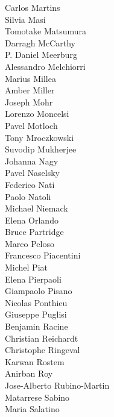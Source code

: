 \documentclass[PICOAPC.tex]{subfiles}
\begin{document}
{\begin{multicols}{4}
Carlos Martins                  \\
Silvia Masi                     \\
Tomotake Matsumura              \\
Darragh McCarthy                \\
P. Daniel Meerburg              \\
Alessandro Melchiorri           \\
Marius Millea                   \\
Amber Miller                    \\
Joseph Mohr                     \\
Lorenzo Moncelsi                \\
Pavel Motloch                   \\
Tony Mroczkowski                \\
Suvodip Mukherjee               \\
Johanna Nagy                    \\
Pavel Naselsky                  \\
Federico Nati                   \\
Paolo Natoli                    \\
Michael Niemack                 \\
Elena Orlando                   \\
Bruce Partridge                 \\
Marco Peloso                    \\
Francesco Piacentini            \\
Michel Piat                     \\
Elena Pierpaoli   \\
Giampaolo Pisano                \\
Nicolas Ponthieu                \\
Giuseppe Puglisi                \\
Benjamin Racine                 \\
Christian Reichardt             \\
Christophe Ringeval             \\
Karwan Rostem                   \\
Anirban Roy                     \\
Jose-Alberto Rubino-Martin      \\
Matarrese Sabino                \\
Maria Salatino                  \\

\end{multicols}}
\end{document}
